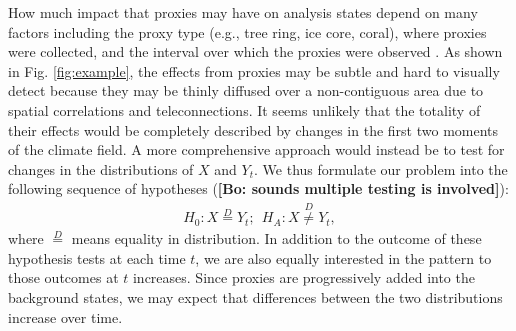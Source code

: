 \documentclass[12pt]{article}
\newcommand{\bl}[1]{\color{Red}\textbf{[Bo: #1]}\normalcolor}
\begin{document}
How much impact that proxies may have on analysis states depend on many factors including the proxy type (e.g., tree ring, ice core, coral), where proxies were collected, and the interval over which the proxies were observed \citep{steiger2018PHYDA}. As shown in Fig. \ref{fig:example}, the effects from proxies may be subtle and hard to visually detect because they may be thinly diffused over a non-contiguous area due to spatial correlations and teleconnections.
It seems unlikely that the totality of their effects would be completely described by changes in the first two moments of the climate field. A more comprehensive approach would instead be to test for changes in the distributions of $X$ and $Y_t$. We thus formulate our problem into the following sequence of hypotheses (\bl{sounds multiple testing is involved}): 
\begin{align}\label{eq:test1}
    H_0: X \stackrel{D}{=} Y_t; \ \ H_A: X \stackrel{D}{\neq} Y_t,
\end{align}
where $\stackrel{D}{=}$ means equality in distribution.
In addition to the outcome of these hypothesis tests at each time $t$, we are also equally interested in the pattern to those outcomes at $t$ increases. Since proxies are progressively added into the background states, we may expect that differences between the two distributions increase over time. 



\end{document}

